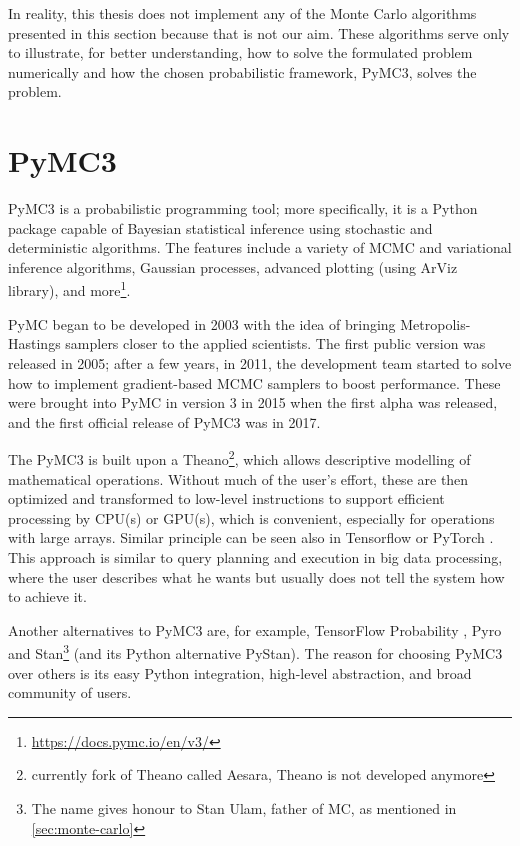 \documentclass[
  digital, %
  oneside, %
  lof,     %
  lot,     %
]{fithesis4}
\begin{document}
In reality, this thesis does not implement any of the Monte Carlo algorithms presented in this section because that is not our aim.
These algorithms serve only to illustrate, for better understanding, how to solve the formulated problem numerically and how the chosen probabilistic framework, PyMC3, solves the problem.


\section{PyMC3}

PyMC3 is a probabilistic programming tool; more specifically, it is a Python package capable of Bayesian statistical inference using stochastic and deterministic algorithms. 
The features include a variety of MCMC and variational inference algorithms, Gaussian processes, advanced plotting (using ArViz library), and more\footnote{\url{https://docs.pymc.io/en/v3/}}.

PyMC began to be developed in 2003 with the idea of bringing Metropolis-Hastings samplers closer to the applied scientists.
The first public version was released in 2005; after a few years, in 2011, the development team started to solve how to implement gradient-based MCMC samplers to boost performance.
These were brought into PyMC in version 3 in 2015 when the first alpha was released, and the first official release of PyMC3 was in 2017.

The PyMC3 is built upon a Theano\footnote{currently fork of Theano called Aesara, Theano is not developed anymore}, which allows descriptive modelling of mathematical operations.
Without much of the user's effort, these are then optimized and transformed to low-level instructions to support efficient processing by CPU(s) or GPU(s), which is convenient, especially for operations with large arrays.
Similar principle can be seen also in Tensorflow \cite{tf} or PyTorch \cite{pytorch}.
This approach is similar to query planning and execution in big data processing, where the user describes what he wants but usually does not tell the system how to achieve it.

Another alternatives to PyMC3 are, for example, TensorFlow Probability \cite{tfp}, Pyro \cite{pyro} and Stan\footnote{The name gives honour to Stan Ulam, father of MC, as mentioned in \autoref{sec:monte-carlo}} \cite{stanmc} (and its Python alternative PyStan).
The reason for choosing PyMC3 over others is its easy Python integration, high-level abstraction, and broad community of users.
\end{document}

